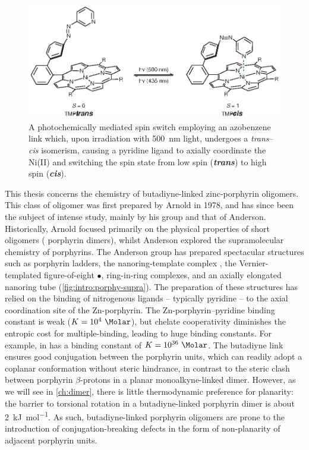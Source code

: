 	\begin{figure}[ht!]
		\centering\includegraphics{figures/intro/switch.eps} 
		\caption[]{A photochemically mediated spin switch employing an azobenzene link which, upon irradiation with \SI{500}{\nano\metre} light, undergoes a \textit{trans}--\textit{cis} isomerism, causing a pyridine ligand to axially coordinate the Ni(II) and switching the spin state from low spin (\textit{\textbf{trans}}) to high spin (\textit{\textbf{cis}}).\autocite{Venkataramani2011}}
		\label{fig:intro:switches}
	\end{figure}

	This thesis concerns the chemistry of butadiyne-linked zinc-porphyrin oligomers. This class of oligomer was first prepared by Arnold in 1978,\autocite{Arnold1978} and has since been the subject of intense study, mainly by his group and that of Anderson.\autocite{Arnold1992,Arnold2000,Anderson1994,Anderson1999} Historically, Arnold focused primarily on the physical properties of short oligomers ( porphyrin dimers),\autocite{Arnold2000} whilst Anderson explored the supramolecular chemistry of porphyrins. The Anderson group has prepared spectacular structures such as porphyrin ladders,\autocite{Taylor1999} the nanoring-template complex ,\autocite{Hoffmann2008} the Vernier-templated figure-of-eight $\bullet{}$,\autocite{OSullivan2011} ring-in-ring complexes,\autocite{Rousseaux2015} and an axially elongated nanoring tube \tubewt{} (\autoref{fig:intro:porphy-supra}).\autocite{Neuhaus2015} The preparation of these structures has relied on the binding of nitrogenous ligands -- typically pyridine -- to the axial coordination site of the Zn-porphyrin. The Zn-porphyrin--pyridine binding constant is weak ($K = 10^4\ \si{\per\Molar}$),\autocite{Cole1972} but chelate cooperativity diminishes the entropic cost for multiple-binding, leading to huge binding constants.\autocite{Hogben2011} For example,  in  has a binding constant of $K = 10^{36}\ \si{\per\Molar}$.\autocite{Hoffmann2008} The butadiyne link ensures good conjugation between the porphyrin units, which can readily adopt a coplanar conformation without steric hindrance, in contrast to the steric clash between porphyrin $\beta$-protons in a planar monoalkyne-linked dimer. However, as we will see in \autoref{ch:dimer}, there is little thermodynamic preference for planarity: the barrier to torsional rotation in a butadiyne-linked porphyrin dimer is about \SI{2}{\kilo\joule\per\mole}.\autocite{Winters2007,Peeks2016} As such, butadiyne-linked porphyrin oligomers are prone to the introduction of conjugation-breaking defects in the form of non-planarity of adjacent porphyrin units. 


